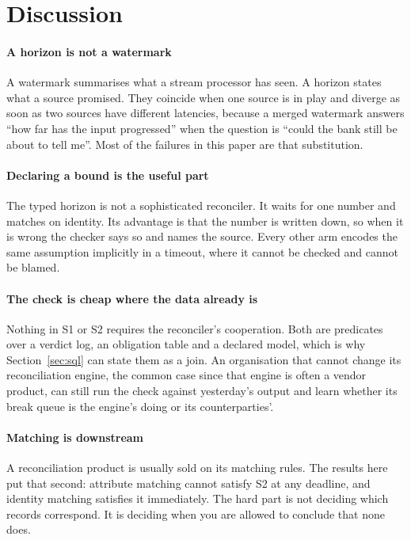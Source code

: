 \documentclass[10pt,conference]{IEEEtran}
\begin{document}
\section{Discussion}

\paragraph{A horizon is not a watermark} A watermark summarises what a stream
processor has seen. A horizon states what a source promised. They coincide when
one source is in play and diverge as soon as two sources have different
latencies, because a merged watermark answers ``how far has the input
progressed'' when the question is ``could the bank still be about to tell me''.
Most of the failures in this paper are that substitution.

\paragraph{Declaring a bound is the useful part} The typed horizon is not a
sophisticated reconciler. It waits for one number and matches on identity. Its
advantage is that the number is written down, so when it is wrong the checker
says so and names the source. Every other arm encodes the same assumption
implicitly in a timeout, where it cannot be checked and cannot be blamed.

\paragraph{The check is cheap where the data already is} Nothing in S1 or S2
requires the reconciler's cooperation. Both are predicates over a verdict log,
an obligation table and a declared model, which is why
Section~\ref{sec:sql} can state them as a join. An organisation that cannot change its reconciliation engine, the common case
since that engine is often a vendor product, can still run the check against yesterday's output
and learn whether its break queue is the engine's doing or its counterparties'.

\paragraph{Matching is downstream} A reconciliation product is usually sold on
its matching rules. The results here put that second: attribute matching cannot
satisfy S2 at any deadline, and identity matching satisfies it immediately. The
hard part is not deciding which records correspond. It is deciding when you are
allowed to conclude that none does.
\end{document}
